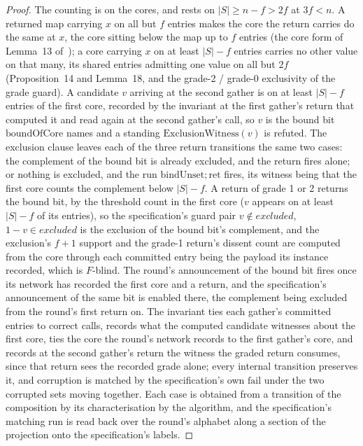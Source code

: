 \begin{proof}\leanok
  The counting is on the cores, and rests on $|S| \ge n - f > 2f$ at $3f < n$.
  A returned map carrying $x$ on all but $f$ entries makes the core the return carries do the same at $x$, the core sitting below the map up to $f$ entries (the core form of Lemma~13 of~\cite{AFW25}); a core carrying $x$ on at least $|S| - f$ entries carries no other value on that many, its shared entries admitting one value on all but $2f$ (Proposition~14 and Lemma~18, and the grade-2 / grade-0 exclusivity of the grade guard).
  A candidate $v$ arriving at the second gather is on at least $|S| - f$ entries of the first core, recorded by the invariant at the first gather's return that computed it and read again at the second gather's call, so $v$ is the bound bit $\mathrm{boundOfCore}$ names and a standing $\mathrm{ExclusionWitness}(v)$ is refuted.
  The exclusion clause leaves each of the three return transitions the same two cases: the complement of the bound bit is already excluded, and the return fires alone; or nothing is excluded, and the run $\mathrm{bindUnset}; \mathrm{ret}$ fires, its witness being that the first core counts the complement below $|S| - f$.
  A return of grade 1 or 2 returns the bound bit, by the threshold count in the first core ($v$ appears on at least $|S| - f$ of its entries), so the specification's guard pair $v \notin excluded$, $1-v \in excluded$ is the exclusion of the bound bit's complement, and the exclusion's $f{+}1$ support and the grade-1 return's dissent count are computed from the core through each committed entry being the payload its instance recorded, which is $F$-blind.
  The round's announcement of the bound bit fires once its network has recorded the first core and a return, and the specification's announcement of the same bit is enabled there, the complement being excluded from the round's first return on.
  The invariant ties each gather's committed entries to correct calls, records what the computed candidate witnesses about the first core, ties the core the round's network records to the first gather's core, and records at the second gather's return the witness the graded return consumes, since that return sees the recorded grade alone; every internal transition preserves it, and corruption is matched by the specification's own $\mathrm{fail}$ under the two corrupted sets moving together.
  Each case is obtained from a transition of the composition by its characterisation by the algorithm, and the specification's matching run is read back over the round's alphabet along a section of the projection onto the specification's labels.
\end{proof}
